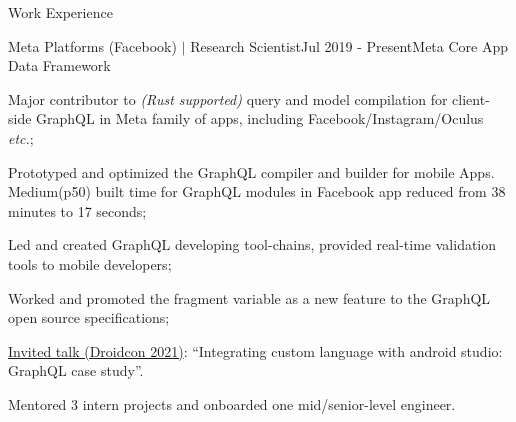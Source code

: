\documentclass{resume} %
\begin{document}

\vspace{2em}
\begin{rSection}{Work Experience}
\begin{rSubsection}{Meta Platforms (Facebook) $|$ Research Scientist}{Jul 2019 - Present}{Meta Core App Data Framework}{}
\item Major contributor to \textit{(Rust supported)} query and model compilation for client-side GraphQL in Meta family of apps, including Facebook/Instagram/Oculus {\it etc.};
\item Prototyped and optimized the GraphQL compiler and builder for mobile Apps. Medium(p50) built time for GraphQL modules in Facebook app reduced from 38 minutes to 17 seconds;
\item Led and created GraphQL developing tool-chains, provided real-time validation tools to mobile developers;
\item Worked and promoted the fragment variable as a new feature to the GraphQL open source specifications;
\item \href{https://www.droidcon.com/2021/11/23/integrating-custom-language-with-android-studio-graphql-case-study/}{Invited talk (Droidcon 2021)}: ``Integrating custom language with android studio: GraphQL case study''.
\item Mentored 3 intern projects and onboarded one mid/senior-level engineer.
\end{rSubsection}

\end{rSection}

\end{document}
